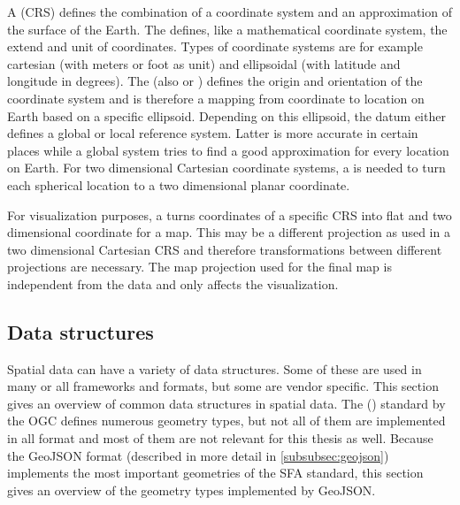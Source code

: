 		A  (CRS) defines the combination of a coordinate system and an approximation of the surface of the Earth.
		The  defines, like a mathematical coordinate system, the extend and unit of coordinates.
		Types of coordinate systems are for example cartesian (with meters or foot as unit) and ellipsoidal (with latitude and longitude in degrees)\cite[11-13]{ordenance-survey-booklet}.
		The  (also  or ) defines the origin and orientation of the coordinate system and is therefore a mapping from coordinate to location on Earth based on a specific ellipsoid.
		Depending on this ellipsoid, the datum either defines a global or local reference system.
		Latter is more accurate in certain places while a global system tries to find a good approximation for every location on Earth.
		For two dimensional Cartesian coordinate systems, a  is needed to turn each  spherical location to a two dimensional planar coordinate\cite[17]{ordenance-survey-booklet}.
		
		For visualization purposes, a  turns coordinates of a specific CRS into flat and two dimensional coordinate for a map.
		This may be a different projection as used in a two dimensional Cartesian CRS and therefore transformations between different projections are necessary.
		The map projection used for the final map is independent from the data and only affects the visualization.

	\subsection{Data structures}
	
		Spatial data can have a variety of data structures.
		Some of these are used in many or all frameworks and formats, but some are vendor specific.
		This section gives an overview of common data structures in spatial data.
		The  () standard by the OGC defines numerous geometry types\cite{ogc-sfa}, but not all of them are implemented in all format and most of them are not relevant for this thesis as well.
		Because the GeoJSON format (described in more detail in \cref{subsubsec:geojson}) implements the most important geometries of the SFA standard\cite[2]{ietf-geojson}, this section gives an overview of the geometry types implemented by GeoJSON.
		
